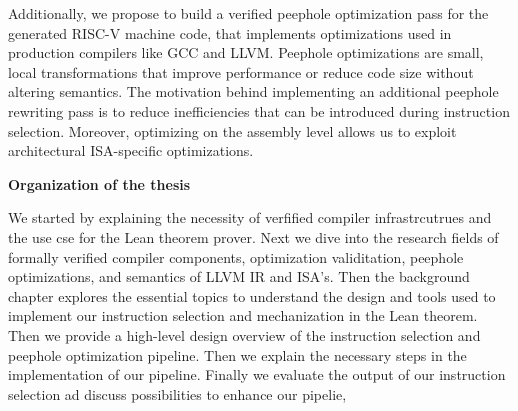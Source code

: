 Additionally, we propose to build a verified peephole optimization pass for the generated RISC-V machine code, that implements optimizations used in production compilers like GCC and LLVM.  Peephole optimizations are small, local transformations that improve performance or reduce code size without altering semantics. The motivation behind implementing an additional peephole rewriting pass is to reduce inefficiencies that can be introduced during instruction selection. Moreover, optimizing on the assembly level allows us to exploit architectural ISA-specific optimizations.





\textbf{Organization of the thesis }

We started by explaining the necessity of verfified compiler infrastrcutrues and the use cse for the Lean theorem prover. Next we dive into the research fields of formally verified compiler components, optimization validitation, peephole optimizations, and semantics of LLVM IR and ISA's. Then the background chapter explores the essential topics to understand the design and tools used to implement our instruction selection and mechanization in the Lean theorem. Then we provide a high-level design overview of the instruction selection and peephole optimization pipeline. Then we explain the necessary steps in the implementation of our pipeline. Finally we evaluate the output of our instruction selection ad discuss possibilities to enhance our pipelie, 
